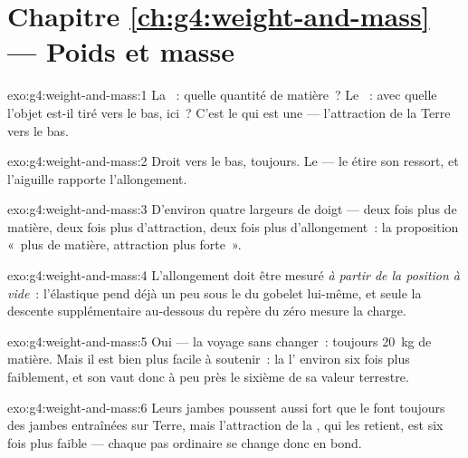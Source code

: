 \section*{Chapitre \ref{ch:g4:weight-and-mass} --- Poids et masse}

\begin{solution}{exo:g4:weight-and-mass:1}
La ~: quelle quantité de matière~? Le ~: avec quelle 
l'objet est-il tiré vers le bas, ici~? C'est le  qui est une
 --- l'attraction de la Terre vers le bas.
\end{solution}

\begin{solution}{exo:g4:weight-and-mass:2}
Droit vers le bas, toujours. Le  --- le  étire son
ressort, et l'aiguille rapporte l'allongement.
\end{solution}

\begin{solution}{exo:g4:weight-and-mass:3}
D'environ quatre largeurs de doigt --- deux fois plus de matière,
deux fois plus d'attraction, deux fois plus d'allongement~: la
proposition «~plus de matière, attraction plus forte~».
\end{solution}

\begin{solution}{exo:g4:weight-and-mass:4}
L'allongement doit être mesuré \emph{à partir de la position à
vide}~: l'élastique pend déjà un peu sous le  du gobelet
lui-même, et seule la descente supplémentaire au-dessous du repère du
zéro mesure la charge.
\end{solution}

\begin{solution}{exo:g4:weight-and-mass:5}
Oui --- la  voyage sans changer~: toujours \qty{20}{kg} de
matière. Mais il est bien plus facile à soutenir~: la  l'
environ six fois plus faiblement, et son  vaut donc à peu près
le sixième de sa valeur terrestre.
\end{solution}

\begin{solution}{exo:g4:weight-and-mass:6}
Leurs jambes poussent aussi fort que le font toujours des jambes
entraînées sur Terre, mais l'attraction de la , qui les retient,
est six fois plus faible --- chaque pas ordinaire se change donc en
bond.
\end{solution}

